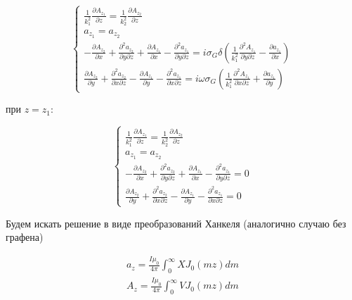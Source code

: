 	\begin{equation}
		\begin{cases}
			\frac{1}{k_1^2} \frac{\partial A_{z_1}}{\partial z} = \frac{1}{k_2^2} \frac{\partial A_{z_2}}{\partial z} \\
			
			a_{z_1} = a_{z_2} \\
			
			-\frac{\partial A_{z_2}}{\partial x} + \frac{\partial^2 a_{z_2}}{\partial y \partial z} + \frac{\partial A_{z_1}}{\partial x} - \frac{\partial^2 a_{z_1}}{\partial y \partial z} = i \sigma_G \delta (\frac{1}{k_1^2} \frac{\partial^2 A_{z_1}}{\partial y \partial z} - \frac{\partial a_{z_1}}{\partial x}) \\
			
			\frac{\partial A_{z_2}}{\partial y} + \frac{\partial^2 a_{z_2}}{\partial x \partial z} - \frac{\partial A_{z_1}}{\partial y} - \frac{\partial^2 a_{z_1}}{\partial x \partial z} = i \omega \sigma_G (\frac{1}{k_1^2} \frac{\partial^2 A_{z_1}}{\partial x \partial z} + \frac{\partial a_{z_1}}{\partial y})
			
			
		\end{cases}
	\end{equation}
	
	при $z = z_1$:
	
	\begin{equation}
		\begin{cases}
			\frac{1}{k_1^2} \frac{\partial A_{z_1}}{\partial z} = \frac{1}{k_2^2} \frac{\partial A_{z_2}}{\partial z} \\
			
			a_{z_1} = a_{z_2} \\
			
			-\frac{\partial A_{z_2}}{\partial x} + \frac{\partial^2 a_{z_2}}{\partial y \partial z} + \frac{\partial A_{z_1}}{\partial x} - \frac{\partial^2 a_{z_1}}{\partial y \partial z} = 0 \\
			
			\frac{\partial A_{z_2}}{\partial y} + \frac{\partial^2 a_{z_2}}{\partial x \partial z} - \frac{\partial A_{z_1}}{\partial y} - \frac{\partial^2 a_{z_1}}{\partial x \partial z} = 0
			
			
		\end{cases}
	\end{equation}
	
	Будем искать решение в виде преобразований Ханкеля (аналогично случаю без графена)
	
	\begin{equation}
		\begin{aligned}
			a_z = \frac{I \mu_0 }{4 \pi} \int_0^{\infty} X J_0(mz)dm \\
			A_z = \frac{I \mu_0 }{4 \pi} \int_0^{\infty} V J_0(mz)dm
		\end{aligned}
	\end{equation}
	
